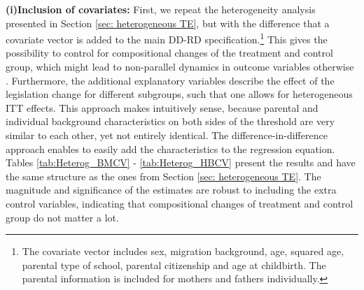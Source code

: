 \documentclass[a4paper ]{article}
\begin{document}
\textbf{(i)Inclusion of covariates:} First, we repeat the heterogeneity analysis presented in Section \ref{sec: heterogeneous TE}, but with the difference that a covariate vector is added to the main DD-RD specification.\footnote{The covariate vector includes sex, migration background, age, squared age, parental type of school, parental citizenship and age at childbirth. The parental information is included for mothers and fathers individually.
} This gives the possibility to control for compositional changes of the treatment and control group, which might lead to non-parallel dynamics in outcome variables otherwise \citep{abadie2005semiparametric}. Furthermore, the additional explanatory variables describe the effect of the legislation change for different subgroups, such that one allows for heterogeneous ITT effects. This approach makes intuitively sense, because parental and individual background characteristics on both sides of the threshold are very similar to each other, yet not entirely identical. The difference-in-difference approach enables to easily add the characteristics to the regression equation.\newline
Tables \ref{tab:Heterog_BMCV} - \ref{tab:Heterog_HBCV} present the results and have the same structure as the ones from Section \ref{sec: heterogeneous TE}. The magnitude and significance of the estimates are robust to including the extra control variables, indicating that compositional changes of treatment and control group do not matter a lot.
\end{document}
